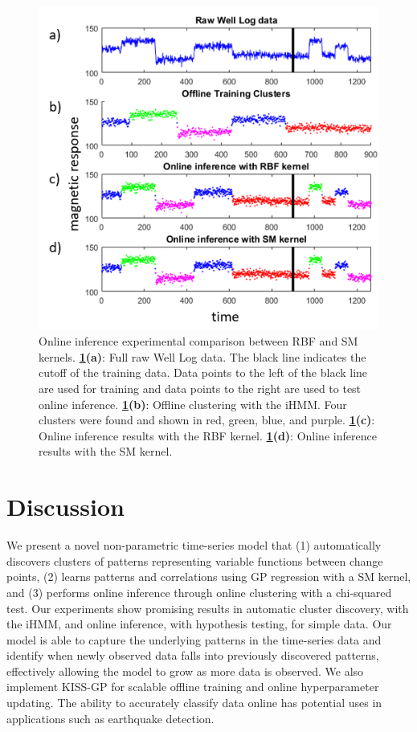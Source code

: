 \documentclass{article}
\begin{document}
\begin{figure}[ht]
\vskip 0.2in
\begin{center}
\centerline{\includegraphics[width=\columnwidth]{OIClust}}
\caption{Online inference experimental comparison between RBF and SM kernels. \textbf{\ref{OIClust}(a)}: Full raw Well Log data. The black line indicates the cutoff of the training data. Data points to the left of the black line are used for training and data points to the right are used to test online inference. \textbf{\ref{OIClust}(b)}: Offline clustering with the iHMM. Four clusters were found and shown in red, green, blue, and purple. \textbf{\ref{OIClust}(c)}: Online inference results with the RBF kernel. \textbf{\ref{OIClust}(d)}: Online inference results with the SM kernel.}
\label{OIClust}
\end{center}
\vskip -0.2in
\end{figure} 

\section{Discussion}

We present a novel non-parametric time-series model that (1) automatically discovers clusters of patterns representing variable functions between change points, (2) learns patterns and correlations using GP regression with a SM kernel, and (3) performs online inference through online clustering with a chi-squared test. Our experiments show promising results in automatic cluster discovery, with the iHMM, and online inference, with hypothesis testing, for simple data. Our model is able to capture the underlying patterns in the time-series data and identify when newly observed data falls into previously discovered patterns, effectively allowing the model to grow as more data is observed. We also implement KISS-GP for scalable offline training and online hyperparameter updating. The ability to accurately classify data online has potential uses in applications such as earthquake detection.
\end{document}
